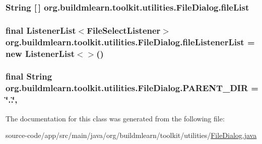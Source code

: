 \subsubsection[{\texorpdfstring{file\+List}{fileList}}]{\setlength{\rightskip}{0pt plus 5cm}String \mbox{[}$\,$\mbox{]} org.\+buildmlearn.\+toolkit.\+utilities.\+File\+Dialog.\+file\+List\hspace{0.3cm}{\ttfamily [private]}}\hypertarget{classorg_1_1buildmlearn_1_1toolkit_1_1utilities_1_1FileDialog_a1e400eed62012e5265738f58fb0f73e1}{}\label{classorg_1_1buildmlearn_1_1toolkit_1_1utilities_1_1FileDialog_a1e400eed62012e5265738f58fb0f73e1}
\subsubsection[{\texorpdfstring{file\+Listener\+List}{fileListenerList}}]{\setlength{\rightskip}{0pt plus 5cm}final Listener\+List$<${\bf File\+Select\+Listener}$>$ org.\+buildmlearn.\+toolkit.\+utilities.\+File\+Dialog.\+file\+Listener\+List = new Listener\+List$<$$>$()\hspace{0.3cm}{\ttfamily [private]}}\hypertarget{classorg_1_1buildmlearn_1_1toolkit_1_1utilities_1_1FileDialog_a2cf83e551b79e78da54f700a1b190fd6}{}\label{classorg_1_1buildmlearn_1_1toolkit_1_1utilities_1_1FileDialog_a2cf83e551b79e78da54f700a1b190fd6}
\subsubsection[{\texorpdfstring{P\+A\+R\+E\+N\+T\+\_\+\+D\+IR}{PARENT_DIR}}]{\setlength{\rightskip}{0pt plus 5cm}final String org.\+buildmlearn.\+toolkit.\+utilities.\+File\+Dialog.\+P\+A\+R\+E\+N\+T\+\_\+\+D\+IR = \char`\"{}..\char`\"{}\hspace{0.3cm}{\ttfamily [static]}, {\ttfamily [private]}}\hypertarget{classorg_1_1buildmlearn_1_1toolkit_1_1utilities_1_1FileDialog_ad807a8c118a38deafe9e989241110418}{}\label{classorg_1_1buildmlearn_1_1toolkit_1_1utilities_1_1FileDialog_ad807a8c118a38deafe9e989241110418}


The documentation for this class was generated from the following file\+:\begin{DoxyCompactItemize}
\item 
source-\/code/app/src/main/java/org/buildmlearn/toolkit/utilities/\hyperlink{FileDialog_8java}{File\+Dialog.\+java}\end{DoxyCompactItemize}
